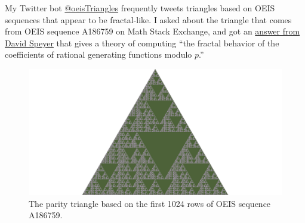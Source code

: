 \documentclass{article}
\begin{document}
My Twitter bot \href{https://twitter.com/oeisTriangles}{@oeisTriangles}
frequently tweets triangles based on OEIS sequences that appear to be
fractal-like. I asked about the triangle that comes from OEIS sequence A186759
on Math Stack Exchange, and got an
\href{https://math.stackexchange.com/a/4569833/121988}{answer from David Speyer}
that gives a theory of computing ``the fractal behavior of the coefficients of
rational generating functions modulo \(p\).''
\begin{figure}[ht!]
  \center
  \includegraphics[trim={800 0 800 0}, clip, width=\textwidth/2]{assets/128_problem/triangle_fractal.jpg}
  \caption{
    The parity triangle based on the first 1024 rows of OEIS sequence A186759.
  }
\end{figure}
\end{document}
